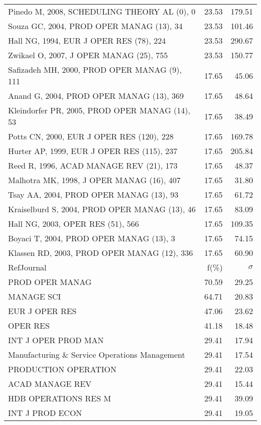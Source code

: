 \documentclass[a4paper,11pt]{report}
\begin{document}
\begin{landscape}
\begin{table}[!ht]
{\begin{tabular}{|l r r|}
Pinedo M, 2008, SCHEDULING THEORY AL (0), 0 & 23.53 & 179.51\\
Souza GC, 2004, PROD OPER MANAG (13), 34 & 23.53 & 101.46\\
Hall NG, 1994, EUR J OPER RES (78), 224 & 23.53 & 290.67\\
Zwikael O, 2007, J OPER MANAG (25), 755 & 23.53 & 150.77\\
Safizadeh MH, 2000, PROD OPER MANAG (9), 111 & 17.65 & 45.06\\
Anand G, 2004, PROD OPER MANAG (13), 369 & 17.65 & 48.64\\
Kleindorfer PR, 2005, PROD OPER MANAG (14), 53 & 17.65 & 38.49\\
Potts CN, 2000, EUR J OPER RES (120), 228 & 17.65 & 169.78\\
Hurter AP, 1999, EUR J OPER RES (115), 237 & 17.65 & 205.84\\
Reed R, 1996, ACAD MANAGE REV (21), 173 & 17.65 & 48.37\\
Malhotra MK, 1998, J OPER MANAG (16), 407 & 17.65 & 31.80\\
Tsay AA, 2004, PROD OPER MANAG (13), 93 & 17.65 & 61.72\\
Kraiselburd S, 2004, PROD OPER MANAG (13), 46 & 17.65 & 83.09\\
Hall NG, 2003, OPER RES (51), 566 & 17.65 & 109.35\\
Boyaci T, 2004, PROD OPER MANAG (13), 3 & 17.65 & 74.15\\
Klassen RD, 2003, PROD OPER MANAG (12), 336 & 17.65 & 60.90\\
\hline
\hline
RefJournal & f(\%) & $\sigma$\\
\hline
PROD OPER MANAG & 70.59 & 29.25\\
MANAGE SCI & 64.71 & 20.83\\
EUR J OPER RES & 47.06 & 23.62\\
OPER RES & 41.18 & 18.48\\
INT J OPER PROD MAN & 29.41 & 17.94\\
Manufacturing \& Service Operations Management & 29.41 & 17.54\\
PRODUCTION OPERATION & 29.41 & 22.03\\
ACAD MANAGE REV & 29.41 & 15.44\\
HDB OPERATIONS RES M & 29.41 & 39.09\\
INT J PROD ECON & 29.41 & 19.05\\
\hline
\end{tabular}
}
\end{table}


\end{landscape}
\end{document}
